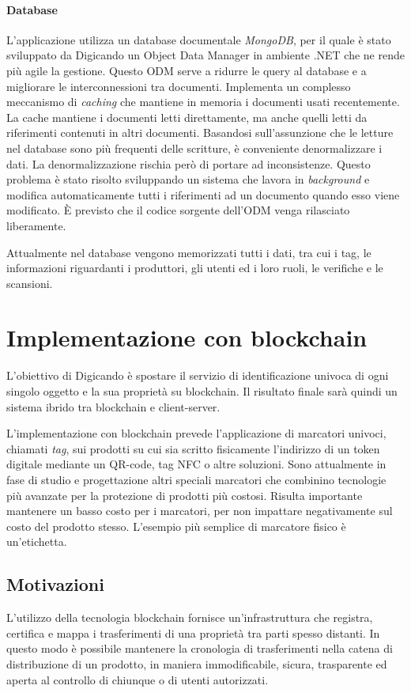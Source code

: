 \paragraph{Database}
\label{database}
L'applicazione utilizza un database documentale \emph{MongoDB}, per il quale è stato sviluppato da Digicando un Object Data Manager in ambiente .NET che ne rende più agile la gestione. Questo ODM serve a ridurre le query al database e a migliorare le interconnessioni tra documenti. Implementa un complesso meccanismo di \emph{caching} che mantiene in memoria i documenti usati recentemente. La cache mantiene i documenti letti direttamente, ma anche quelli letti da riferimenti contenuti in altri documenti. Basandosi sull'assunzione che le letture nel database sono più frequenti delle scritture, è conveniente denormalizzare i dati. La denormalizzazione rischia però di portare ad inconsistenze. Questo problema è stato risolto sviluppando un sistema che lavora in \emph{background} e modifica automaticamente tutti i riferimenti ad un documento quando esso viene modificato. È previsto che il codice sorgente dell'ODM venga rilasciato liberamente.

Attualmente nel database vengono memorizzati tutti i dati, tra cui i tag, le informazioni riguardanti i produttori, gli utenti ed i loro ruoli, le verifiche e le scansioni.

\section{Implementazione con blockchain}
\label{implementazione-con-blockchain}
L'obiettivo di Digicando è spostare il servizio di identificazione univoca di ogni singolo oggetto e la sua proprietà su blockchain. Il risultato finale sarà quindi un sistema ibrido tra blockchain e client-server.

L'implementazione con blockchain prevede l'applicazione di marcatori univoci, chiamati \emph{tag}, sui prodotti su cui sia scritto fisicamente l'indirizzo di un token digitale mediante un QR-code, tag NFC o altre soluzioni. Sono attualmente in fase di studio e progettazione altri speciali marcatori che combinino tecnologie più avanzate per la protezione di prodotti più costosi. Risulta importante mantenere un basso costo per i marcatori, per non impattare negativamente sul costo del prodotto stesso. L'esempio più semplice di marcatore fisico è un'etichetta.

\subsection{Motivazioni}
\label{motivazioni}
L'utilizzo della tecnologia blockchain fornisce un'infrastruttura che registra, certifica e mappa i trasferimenti di una proprietà tra parti spesso distanti. In questo modo è possibile mantenere la cronologia di trasferimenti nella catena di distribuzione di un prodotto, in maniera immodificabile, sicura, trasparente ed aperta al controllo di chiunque o di utenti autorizzati.

